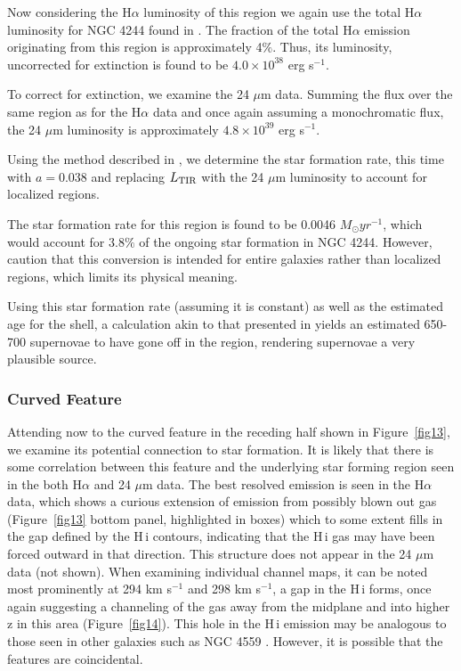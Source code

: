 \documentclass{emulateapj}
\begin{document}
\par
     Now considering the H$\alpha$ luminosity of this region we again use the total H$\alpha$ luminosity for NGC 4244 found in \citet{1999ApJ...522..669H}.  The fraction of the total H$\alpha$ emission originating from this region is approximately 4$\%$.  Thus, its luminosity, uncorrected for extinction is found to be $4.0\times10^{38}$ erg s$^{-1}$.

\par
     To correct for extinction, we examine the 24 $\mu$m data.  Summing the flux over the same region as for the H$\alpha$ data and once again assuming a monochromatic flux, the 24 $\mu$m luminosity is approximately $4.8\times10^{39}$ erg s$^{-1}$.

\par
     Using the method described in \citet{2007ApJ...671..333K}, we determine the star formation rate, this time with $a=0.038$ and replacing $L_{\rm TIR}$ with the 24 $\mu$m luminosity to account for localized regions.
\par
     The star formation rate for this region is found to be 0.0046 $M_{\odot}yr^{-1}$, which would account for 3.8$\%$ of the ongoing star formation in NGC 4244. However, \citealt{2007ApJ...671..333K} caution that this conversion is intended for entire galaxies rather than localized regions, which limits its physical meaning.

\par
     Using this star formation rate (assuming it is constant) as well as the estimated age for the shell, a calculation akin to that presented in \citet{1997ApJ...476..144M} yields an estimated 650-700 supernovae to have gone off in the region, rendering supernovae a very plausible source.

\subsubsection{Curved Feature}\label{Section6.4.2}

\par
     Attending now to the curved feature in the receding half shown in Figure~\ref{fig13}, we examine its potential connection to star formation.   It is likely that there is some correlation between this feature and the underlying star forming region seen in the both H$\alpha$ and 24 $\mu$m data.  The best resolved emission is seen in the H$\alpha$ data, which shows a curious extension of emission from possibly blown out gas (Figure~\ref{fig13} bottom panel, highlighted in boxes) which to some extent fills in the gap defined by the {\sc H\,i} contours, indicating that the {\sc H\,i} gas may have been forced outward in that direction.  This structure does not appear in the 24 $\mu$m data (not shown).  When examining individual channel maps, it can be noted most prominently at 294 km s$^{-1}$ and 298 km s$^{-1}$, a gap in the {\sc H\,i} forms, once again suggesting a channeling of the gas away from the midplane and into higher z in this area (Figure~\ref{fig14}). This hole in the {\sc H\,i} emission may be analogous to those seen in other galaxies such as NGC 4559 \citep{2005A&A...439..947B}. However, it is possible that the features are coincidental.
\end{document}
